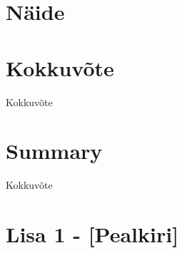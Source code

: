 \documentclass[a4paper,12pt]{article} %
\begin{document}
\section{Näide}

\section{Kokkuvõte}
Kokkuvõte

\pagebreak

\section{Summary}
Kokkuvõte

\pagebreak




\pagebreak

\section*{Lisa 1 - [Pealkiri]}
\end{document}
